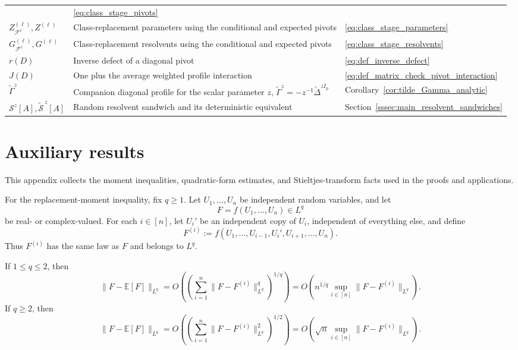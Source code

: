 \documentclass[EJP, preprint, NODS, nobera, nofontexpansion]{ejpecp}
\begin{document}
{\begin{longtable}{@{}
>{\raggedright\arraybackslash}p{}
>{\raggedright\arraybackslash}p{}
>{\raggedright\arraybackslash}p{}
@{}}
& \eqref{eq:class_stage_pivots} \\
$Z_{\mathcal F^{\ell}}^{(\ell)},Z^{(\ell)}$
& Class-replacement parameters using the conditional and expected pivots
& \eqref{eq:class_stage_parameters} \\
$G_{\mathcal F^{\ell}}^{(\ell)},G^{(\ell)}$
& Class-replacement resolvents using the conditional and expected pivots
& \eqref{eq:class_stage_resolvents} \\
$r(D)$
& Inverse defect of a diagonal pivot
& \eqref{eq:def_inverse_defect} \\
$J(D)$
& One plus the average weighted profile interaction
& \eqref{eq:def_matrix_check_pivot_interaction} \\
$\tilde\Gamma^z$
& Companion diagonal profile for the scalar parameter $z$,
  $\tilde\Gamma^z=-z^{-1}\widetilde\Delta^{zI_p}$
& Corollary~\ref{cor:tilde_Gamma_analytic} \\
$\mathcal S^z[A],\widetilde{\mathcal S}^{\,z}[A]$
& Random resolvent sandwich and its deterministic equivalent
& Section~\ref{sssec:main_resolvent_sandwiches} \\
\end{longtable}}

\section{Auxiliary results}
\label{app:auxiliary_results}

This appendix collects the moment inequalities, quadratic-form estimates,
and Stieltjes-transform facts used in the proofs and applications.

For the replacement-moment inequality, fix $q\geq1$.
Let $U_1,\ldots,U_n$ be independent
random variables, and let
\[
    F=f(U_1,\ldots,U_n)\in L^q
\]
be real- or complex-valued.  For each $i\in[n]$, let $U_i'$ be an
independent copy of $U_i$, independent of everything else, and define
\[
    F^{(i)}
    :=f(U_1,\ldots,U_{i-1},U_i',U_{i+1},\ldots,U_n).
\]
Thus $F^{(i)}$ has the same law as $F$ and belongs to $L^q$.

\begin{theorem}
\label{the:efron_stein_Lq_simple}
If $1\leq q\leq2$, then
\[
    \|F-\mathbb E[F]\|_{L^q}
    = O\!\left(
      \left(\sum_{i=1}^n\|F-F^{(i)}\|_{L^q}^q\right)^{1/q}
    \right)
    = O\!\left(
      n^{1/q}\sup_{i\in[n]}\|F-F^{(i)}\|_{L^q}
    \right).
\]
If $q\geq2$, then
\[
    \|F-\mathbb E[F]\|_{L^q}
    = O\!\left(
      \left(\sum_{i=1}^n\|F-F^{(i)}\|_{L^q}^2\right)^{1/2}
    \right)
    = O\!\left(
      \sqrt n\sup_{i\in[n]}\|F-F^{(i)}\|_{L^q}
    \right).
\]
\end{theorem}
\end{document}
